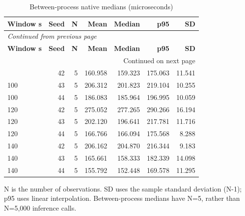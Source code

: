 \documentclass[10pt,a4paper]{article}
\begin{document}
\begin{longtable}{@{}lrrrrrr@{}}
\caption{Between-process native medians (microseconds)}\\
\toprule
\textbf{Window s} & \textbf{Seed} & \textbf{N} & \textbf{Mean} & \textbf{Median} & \textbf{p95} & \textbf{SD} \\
\midrule\endfirsthead
\multicolumn{7}{l}{\small\itshape Continued from previous page}\\
\toprule
\textbf{Window s} & \textbf{Seed} & \textbf{N} & \textbf{Mean} & \textbf{Median} & \textbf{p95} & \textbf{SD} \\
\midrule\endhead
\midrule\multicolumn{7}{r}{\small Continued on next page}\\\endfoot
\bottomrule\endlastfoot
100 & 42 & 5 & 160.958 & 159.323 & 175.063 & 11.541 \\
100 & 43 & 5 & 206.312 & 201.823 & 219.104 & 10.255 \\
100 & 44 & 5 & 186.083 & 185.964 & 196.995 & 10.059 \\
120 & 42 & 5 & 275.052 & 277.265 & 290.266 & 16.194 \\
120 & 43 & 5 & 202.120 & 196.641 & 217.781 & 11.716 \\
120 & 44 & 5 & 166.766 & 166.094 & 175.568 & 8.288 \\
140 & 42 & 5 & 206.162 & 204.870 & 216.344 & 9.183 \\
140 & 43 & 5 & 165.661 & 158.333 & 182.339 & 14.098 \\
140 & 44 & 5 & 155.792 & 152.448 & 169.578 & 11.295 \\
\end{longtable}\endgroup
\noindent\small N is the number of observations. SD uses the sample standard deviation (N-1); p95 uses linear interpolation. Between-process medians have N=5, rather than N=5,000 inference calls.\normalsize\par\medskip
\end{document}
